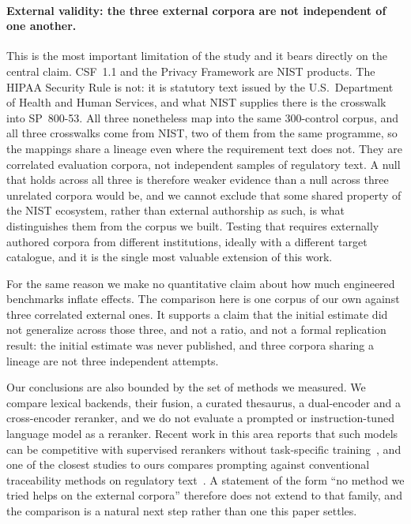 \documentclass[a4paper,fleqn]{cas-sc}
\begin{document}
\paragraph{External validity: the three external corpora are not independent of one another.}
This is the most important limitation of the study and it bears directly on the central claim.
CSF~1.1 and the Privacy Framework are NIST products. The HIPAA Security Rule is not: it is statutory text issued by the U.S.\ Department of Health and Human Services, and what NIST supplies there is the crosswalk into SP~800-53. All three nonetheless map into the same 300-control corpus, and all three crosswalks come from NIST, two of them from the same programme, so the mappings share a lineage even where the requirement text does not.
They are correlated evaluation corpora, not independent samples of regulatory text.
A null that holds across all three is therefore weaker evidence than a null across three unrelated corpora would be, and we cannot exclude that some shared property of the NIST ecosystem, rather than external authorship as such, is what distinguishes them from the corpus we built.
Testing that requires externally authored corpora from different institutions, ideally with a different target catalogue, and it is the single most valuable extension of this work.

For the same reason we make no quantitative claim about how much engineered benchmarks inflate effects.
The comparison here is one corpus of our own against three correlated external ones. It supports a claim that the initial estimate did not generalize across those three, and not a ratio, and not a formal replication result: the initial estimate was never published, and three corpora sharing a lineage are not three independent attempts.

Our conclusions are also bounded by the set of methods we measured. We compare lexical backends, their fusion, a curated thesaurus, a dual-encoder and a cross-encoder reranker, and we do not evaluate a prompted or instruction-tuned language model as a reranker. Recent work in this area reports that such models can be competitive with supervised rerankers without task-specific training~\citep{Sun2023}, and one of the closest studies to ours compares prompting against conventional traceability methods on regulatory text~\citep{Etezadi2026}. A statement of the form ``no method we tried helps on the external corpora'' therefore does not extend to that family, and the comparison is a natural next step rather than one this paper settles.
\end{document}
